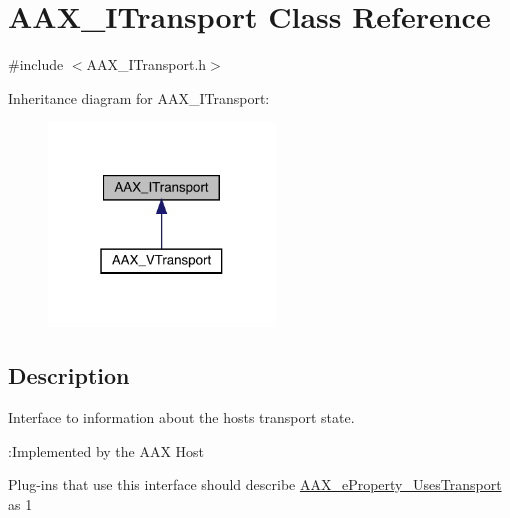 \hypertarget{a01885}{}\section{A\+A\+X\+\_\+\+I\+Transport Class Reference}
\label{a01885}


{\ttfamily \#include $<$A\+A\+X\+\_\+\+I\+Transport.\+h$>$}



Inheritance diagram for A\+A\+X\+\_\+\+I\+Transport\+:
\nopagebreak
\begin{figure}[H]
\begin{center}
\leavevmode
\includegraphics[width=171pt]{a01884}
\end{center}
\end{figure}


\subsection{Description}
Interface to information about the host\textquotesingle{}s transport state. 

\begin{DoxyRefDesc}{\+:\+Implemented by the A\+A\+X Host}
\item[\mbox{\hyperlink{a00790__aax_host_implementation000012}{\+:\+Implemented by the A\+A\+X Host}}]\end{DoxyRefDesc}


Plug-\/ins that use this interface should describe \mbox{\hyperlink{a00662_a13e384f22825afd3db6d68395b79ce0daf3e1162c5f517595589d513d48158dbd}{A\+A\+X\+\_\+e\+Property\+\_\+\+Uses\+Transport}} as 1

